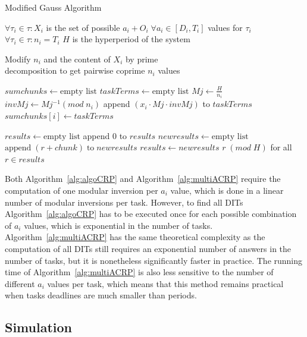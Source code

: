 \documentclass[conference]{IEEEtran}
\begin{document}
		\begin{algorithm}
			\caption{Modified Gauss Algorithm}
			\label{alg:multiACRP}
			\begin{algorithmic}[1]
				\REQUIRE $\forall \tau_i \in \tau: X_i$ is the set of possible $a_i+O_i
				\; \forall a_i \in [D_i,T_i]$ values for $\tau_i$
				\REQUIRE $\forall \tau_i \in \tau : n_i = T_i$
				\REQUIRE $H$ is the hyperperiod of the system

				\STATE Modify $n_i$ and the content of $X_i$ by prime
				\\ decomposition to get pairwise coprime $n_i$ values

				\STATE $sumchunks \leftarrow \text{empty list}$
					\STATE $taskTerms \leftarrow \text{empty list}$
					\STATE $Mj \leftarrow \frac{H}{n_i}$
					\STATE $invMj \leftarrow Mj^{-1} (mod \; n_i)$
						\STATE append $(x_i \cdot Mj \cdot invMj)$ to $taskTerms$
					\ENDFOR
					\STATE $sumchunks[i] \leftarrow taskTerms$
				\ENDFOR

				\STATE $results \leftarrow \text{empty list}$
				\STATE append $0$ to $results$
					\STATE $newresults \leftarrow \text{empty list}$
							\STATE $\text{append} \; (r + chunk) \; \text{to} \; newresults$
						\ENDFOR
					\ENDFOR
					\STATE $results \leftarrow newresults$
				\ENDFOR
				\RETURN $r \; (mod \; H)$ for all $r \in results$
			\end{algorithmic}
		\end{algorithm}

		Both Algorithm~\ref{alg:algoCRP} and Algorithm~\ref{alg:multiACRP} require the
		computation of one modular inversion per $a_i$ value, which is done in a
		linear number of modular inversions per task. However, to
		find all DITs Algorithm~\ref{alg:algoCRP} has to be executed once for each possible
		combination of $a_i$ values, which is exponential in the number of tasks.
		Algorithm~\ref{alg:multiACRP} has the same theoretical complexity as the
		computation of all DITs still requires an exponential number of answers in the
		number of tasks, but it is nonetheless significantly faster in practice. The
		running time of Algorithm~\ref{alg:multiACRP} is also less sensitive to the
		number of different $a_i$ values per task, which means that this method
		remains practical when tasks deadlines are much smaller than periods.

	\subsection{Simulation}
	\label{sct:noFPDITsimu}
\end{document}

